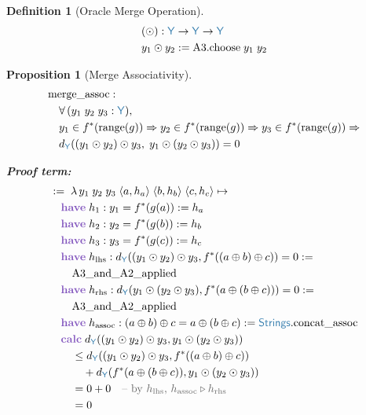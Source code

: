 \documentclass[11pt]{article}
\theoremstyle{definition}
\newtheorem{defnenv}{Definition}
\theoremstyle{plain}
\newtheorem{propenv}{Proposition}
\newcommand{\kw}[1]{\textcolor{keyword}{\textbf{#1}}}
\newcommand{\ty}[1]{\textcolor{type}{\mathsf{#1}}}
\newcommand{\fn}[1]{\mathrm{#1}}
\newcommand{\cmt}[1]{\textcolor{comment}{\text{-- #1}}}
\newcommand{\lam}{\lambda\,}
\newcommand{\all}{\forall\,}
\newcommand{\arr}{\to}
\newcommand{\Arr}{\Rightarrow}
\newcommand{\defeq}{:=}
\newcommand{\pf}{:=\;}
\newcommand{\Strings}{\ty{Strings}}
\newcommand{\Y}{\ty{Y}}
\newcommand{\fstar}{f^*}
\newcommand{\dY}{d_{\Y}}
\newcommand{\concat}{\oplus}
\begin{document}
\begin{defnenv}[Oracle Merge Operation]
\label{def:odot}
\begin{align*}
&(\odot) : \Y \arr \Y \arr \Y \\
&y_1 \odot y_2 \defeq \fn{A3}.\fn{choose}\; y_1\; y_2
\end{align*}
\end{defnenv}

\begin{propenv}[Merge Associativity]
\label{prop:assoc}
\begin{align*}
&\fn{merge\_assoc} : \\
&\quad \all (y_1\; y_2\; y_3 : \Y), \\
&\quad y_1 \in \fstar(\fn{range}(g)) \Arr y_2 \in \fstar(\fn{range}(g)) \Arr y_3 \in \fstar(\fn{range}(g)) \Arr \\
&\quad \dY((y_1 \odot y_2) \odot y_3,\; y_1 \odot (y_2 \odot y_3)) = 0
\end{align*}

\textbf{Proof term:}
\begin{align*}
&\pf \lam y_1\; y_2\; y_3\; \langle a, h_a \rangle\; \langle b, h_b \rangle\; \langle c, h_c \rangle \mapsto \\
&\quad \kw{have}\; h_1 : y_1 = \fstar(g(a)) := h_a \\
&\quad \kw{have}\; h_2 : y_2 = \fstar(g(b)) := h_b \\
&\quad \kw{have}\; h_3 : y_3 = \fstar(g(c)) := h_c \\
&\quad \kw{have}\; h_{\text{lhs}} : \dY((y_1 \odot y_2) \odot y_3, \fstar((a \concat b) \concat c)) = 0 := \\
&\quad\quad \fn{A3\_and\_A2\_applied} \\
&\quad \kw{have}\; h_{\text{rhs}} : \dY(y_1 \odot (y_2 \odot y_3), \fstar(a \concat (b \concat c))) = 0 := \\
&\quad\quad \fn{A3\_and\_A2\_applied} \\
&\quad \kw{have}\; h_{\text{assoc}} : (a \concat b) \concat c = a \concat (b \concat c) := \Strings.\fn{concat\_assoc} \\
&\quad \kw{calc}\; \dY((y_1 \odot y_2) \odot y_3, y_1 \odot (y_2 \odot y_3)) \\
&\quad\quad \leq \dY((y_1 \odot y_2) \odot y_3, \fstar((a \concat b) \concat c)) \\
&\quad\quad\quad + \dY(\fstar(a \concat (b \concat c)), y_1 \odot (y_2 \odot y_3)) \\
&\quad\quad = 0 + 0 \quad\cmt{by $h_{\text{lhs}}$, $h_{\text{assoc}} \triangleright h_{\text{rhs}}$} \\
&\quad\quad = 0
\end{align*}
\end{propenv}
\end{document}

